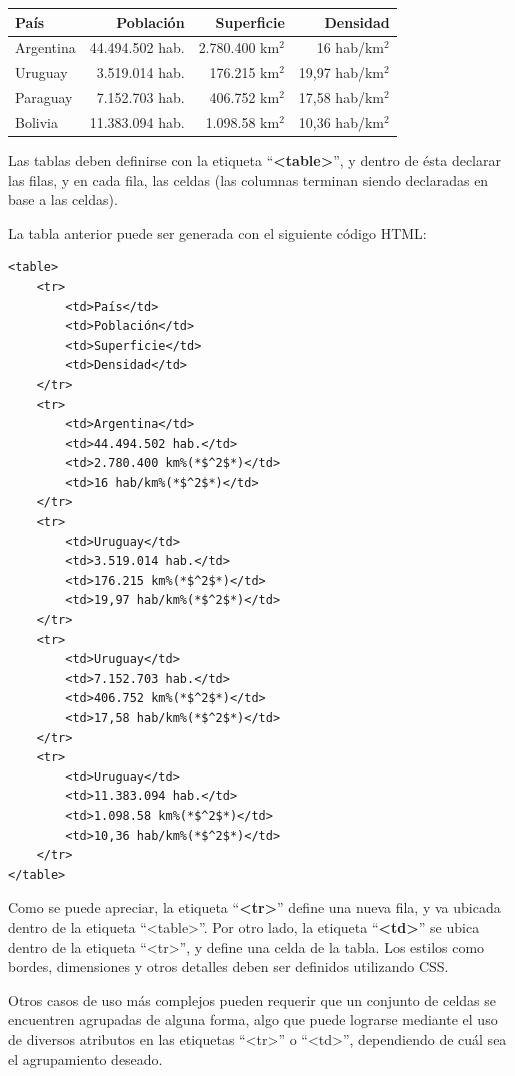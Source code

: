 \begin{tabular}{| l || r | r | r |}
    \hline
    País & Población & Superficie & Densidad \\
    \hline
    \hline
    Argentina & 44.494.502 hab. & 2.780.400 km$^2$ & 16 hab/km$^2$ \\
    \hline
    Uruguay & 3.519.014 hab. & 176.215 km$^2$ & 19,97 hab/km$^2$ \\
    \hline
    Paraguay & 7.152.703 hab. & 406.752 km$^2$ & 17,58 hab/km$^2$ \\
    \hline
    Bolivia & 11.383.094 hab. & 1.098.58 km$^2$ & 10,36 hab/km$^2$ \\
    \hline
\end{tabular}

Las tablas deben definirse con la etiqueta ``\textbf{<table>}'', y dentro de ésta
declarar las filas, y en cada fila, las celdas (las columnas terminan siendo
declaradas en base a las celdas).

La tabla anterior puede ser generada con el siguiente código HTML:

\begin{lstlisting}[language=XHTML]
<table>
    <tr>
        <td>País</td>
        <td>Población</td>
        <td>Superficie</td>
        <td>Densidad</td>
    </tr>
    <tr>
        <td>Argentina</td>
        <td>44.494.502 hab.</td>
        <td>2.780.400 km%(*$^2$*)</td>
        <td>16 hab/km%(*$^2$*)</td>
    </tr>
    <tr>
        <td>Uruguay</td>
        <td>3.519.014 hab.</td>
        <td>176.215 km%(*$^2$*)</td>
        <td>19,97 hab/km%(*$^2$*)</td>
    </tr>
    <tr>
        <td>Uruguay</td>
        <td>7.152.703 hab.</td>
        <td>406.752 km%(*$^2$*)</td>
        <td>17,58 hab/km%(*$^2$*)</td>
    </tr>
    <tr>
        <td>Uruguay</td>
        <td>11.383.094 hab.</td>
        <td>1.098.58 km%(*$^2$*)</td>
        <td>10,36 hab/km%(*$^2$*)</td>
    </tr>
</table>
\end{lstlisting}

Como se puede apreciar, la etiqueta ``\textbf{<tr>}'' define una nueva fila,
y va ubicada dentro de la etiqueta ``<table>''. Por otro lado, la etiqueta
``\textbf{<td>}'' se ubica dentro de la etiqueta ``<tr>'', y define una celda
de la tabla. Los estilos como bordes, dimensiones y otros detalles deben ser
definidos utilizando CSS.

Otros casos de uso más complejos pueden requerir que un conjunto de celdas se
encuentren agrupadas de alguna forma, algo que puede lograrse mediante el uso
de diversos atributos en las etiquetas ``<tr>'' o ``<td>'', dependiendo de cuál
sea el agrupamiento deseado.

